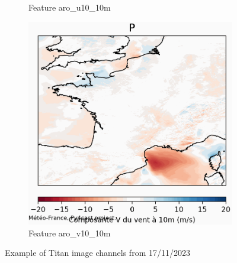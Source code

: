 \begin{figure}[h]
\begin{subfigure}[b]{0.3\textwidth}
        \caption{Feature aro\_u10\_10m}
        \label{fig:titan_aro_u10}
    \end{subfigure}
    \hfill
    \begin{subfigure}[b]{0.3\textwidth}
        \includegraphics[width=\textwidth]{Images/titan_data_examples/2023111700_feature_aro_v10_10m.png}
        \caption{Feature aro\_v10\_10m}
        \label{fig:titan_aro_v10}
    \end{subfigure}
    \caption{Example of Titan image channels from 17/11/2023}
    \label{fig:titan-examples}
\end{figure}